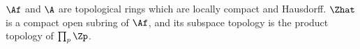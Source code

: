 $\Af$ and $\A$ are topological rings which are locally compact and Hausdorff. $\Zhat$ is a compact open subring of $\Af$,
and its subspace topology is the product topology of $\prod_p\Zp$.
